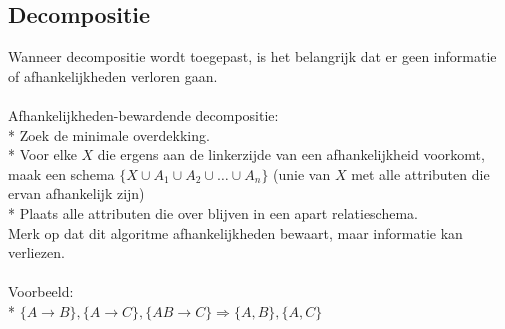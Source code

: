 \documentclass[10pt]{article}
\begin{document}
\subsection{Decompositie}
Wanneer decompositie wordt toegepast, is het belangrijk dat er geen informatie of afhankelijkheden verloren gaan.\\\\
Afhankelijkheden-bewardende decompositie:\\*
Zoek de minimale overdekking.\\*
Voor elke $X$ die ergens aan de linkerzijde van een afhankelijkheid voorkomt, maak een schema $\{X \cup A_1 \cup A_2 \cup \dots \cup A_n\}$ (unie van $X$ met alle attributen die ervan afhankelijk zijn)\\*
Plaats alle attributen die over blijven in een apart relatieschema.\\
Merk op dat dit algoritme afhankelijkheden bewaart, maar informatie kan verliezen.\\\\
Voorbeeld:\\*
$\{A \rightarrow B\}, \{A \rightarrow C\}, \{AB \rightarrow C\} \Rightarrow \{A, B\}, \{A, C\}$
\end{document}
